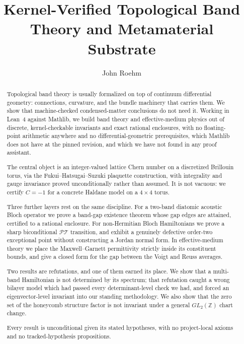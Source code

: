 \documentclass[aps,prb,reprint,nofootinbib,superscriptaddress]{revtex4-2}
\newcommand{\Lean}{Lean~4}
\begin{document}
\title{Kernel-Verified Topological Band Theory and Metamaterial Substrate}

\author{John Roehm}

\begin{abstract}
Topological band theory is usually formalized on top of continuum differential geometry: connections, curvature, and the bundle machinery that carries them. We show that machine-checked
condensed-matter conclusions do not need it. Working in \Lean{} against Mathlib, we build band
theory and effective-medium physics out of discrete, kernel-checkable invariants and exact
rational enclosures, with no floating-point arithmetic anywhere and no differential-geometric prerequisites, which Mathlib does not have at the pinned revision, and which we have not
found in any proof assistant.

The central object is an integer-valued lattice Chern number on a discretized Brillouin torus,
via the Fukui--Hatsugai--Suzuki plaquette construction, with integrality and gauge invariance
proved unconditionally rather than assumed. It is not vacuous: we certify $C = -1$ for a
concrete Haldane model on a $4\times4$ torus.

Three further layers rest on the same discipline. For a two-band diatomic acoustic Bloch
operator we prove a band-gap existence theorem whose gap edges are attained, certified to a
rational enclosure. For non-Hermitian Bloch Hamiltonians we prove a sharp biconditional
$\mathcal{PT}$ transition, and exhibit a genuinely defective order-two exceptional point
without constructing a Jordan normal form. In effective-medium theory we place the
Maxwell--Garnett permittivity strictly inside its constituent bounds, and give a closed form
for the gap between the Voigt and Reuss averages.

Two results are refutations, and one of them earned its place. We show that a multi-band
Hamiltonian is not determined by its spectrum; that refutation caught a wrong bilayer model
which had passed every determinant-level check we had, and forced an eigenvector-level
invariant into our standing methodology. We also show that the zero set of the honeycomb
structure factor is not invariant under a general $GL_2(\mathbb{Z})$ chart change.

Every result is unconditional given its stated hypotheses, with no project-local axioms and no
tracked-hypothesis propositions.
\end{abstract}

\maketitle
\end{document}

